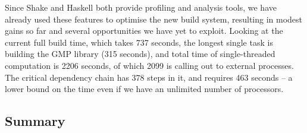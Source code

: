 Since Shake and Haskell both provide profiling and analysis tools, we have
already used these features to optimise the new build system, resulting in
modest gains so far and several opportunities we have yet to exploit. Looking at
the current full build time, which takes 737 seconds, the longest single task is
building the GMP library (315 seconds), and total time of single-threaded
computation is 2206 seconds, of which 2099 is calling out to external processes.
The critical dependency chain has 378 steps in it, and requires 463 seconds -- a
lower bound on the time even if we have an unlimited number of processors.

\subsection{Summary}




